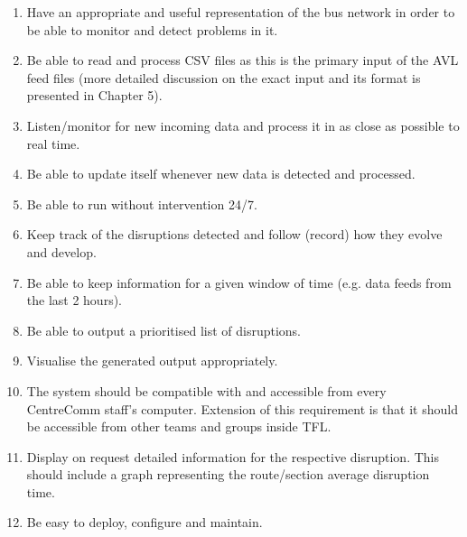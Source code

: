 \begin{enumerate}
	\item Have an appropriate and useful representation of the bus network in order to be able to monitor and detect problems in it.
	\item Be able to read and process CSV files as this is the primary input of the AVL feed files (more detailed discussion on the exact input and its format is presented in Chapter 5).
	\item Listen/monitor for new incoming data and process it in as close as possible to real time.
	\item Be able to update itself whenever new data is detected and processed.
	\item Be able to run without intervention 24/7.
	\item Keep track of the disruptions detected and follow (record) how they evolve and develop.
	\item Be able to keep information for a given window of time (e.g. data feeds from the last 2 hours).
	\item Be able to output a prioritised list of disruptions.
	\item Visualise the generated output appropriately.
	\item The system should be compatible with and accessible from every CentreComm staff's computer. Extension of this requirement is that it should be accessible from other teams and groups inside TFL.
	\item Display on request detailed information for the respective disruption. This should include a graph representing the route/section average disruption time.
	\item Be easy to deploy, configure and maintain.
\end{enumerate}